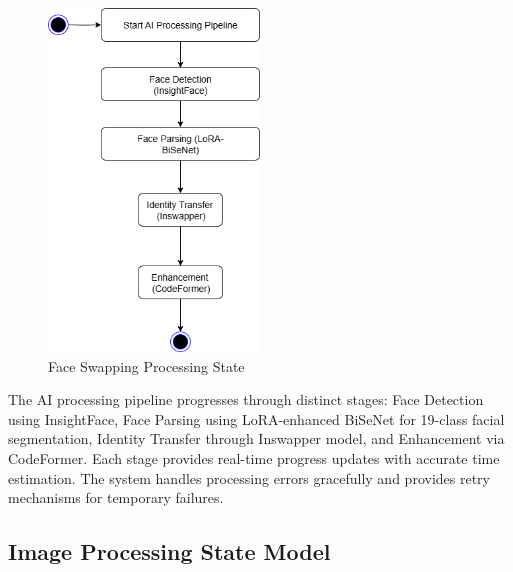 \documentclass[12pt,a4paper]{report}
\begin{document}
\begin{figure}[H]
\centering
\includegraphics[width=0.5\textwidth]{figures/face_swapping_processing_state.png}
\caption{Face Swapping Processing State}
\label{fig:face_swapping_processing_state}
\end{figure}

The AI processing pipeline progresses through distinct stages: Face Detection using InsightFace, Face Parsing using LoRA-enhanced BiSeNet for 19-class facial segmentation, Identity Transfer through Inswapper model, and Enhancement via CodeFormer. Each stage provides real-time progress updates with accurate time estimation. The system handles processing errors gracefully and provides retry mechanisms for temporary failures.

\subsection{Image Processing State Model}
\end{document}
